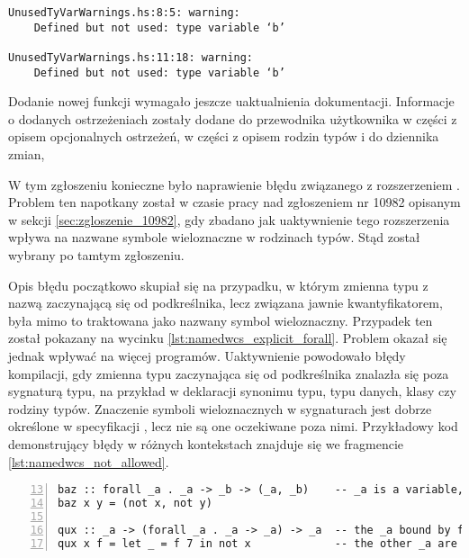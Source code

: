 \begin{lstlisting}[float,language={},label={lst:unused_test_stderr},
                   caption={Ostrzeżenia generowany przez kompilator dla fragmentu \ref{lst:unused_test_code} po wprowadzeniu zmian.}]
UnusedTyVarWarnings.hs:8:5: warning:
    Defined but not used: type variable ‘b’

UnusedTyVarWarnings.hs:11:18: warning:
    Defined but not used: type variable ‘b’
\end{lstlisting}

Dodanie nowej funkcji wymagało jeszcze uaktualnienia dokumentacji. Informacje o
dodanych ostrzeżeniach zostały dodane do przewodnika użytkownika w części z
opisem opcjonalnych ostrzeżeń, w części z opisem rodzin typów i do dziennika
zmian,


\label{sec:zgloszenie_11098}

W tym zgłoszeniu konieczne było naprawienie błędu związanego z rozszerzeniem
. Problem ten napotkany został w czasie pracy nad
zgłoszeniem nr 10982 opisanym w sekcji \ref{sec:zgloszenie_10982}, gdy zbadano
jak uaktywnienie tego rozszerzenia wpływa na nazwane symbole wieloznaczne w
rodzinach typów. Stąd został wybrany po tamtym zgłoszeniu.

Opis błędu początkowo skupiał się na przypadku, w którym zmienna typu z nazwą
zaczynającą się od podkreślnika, lecz związana jawnie kwantyfikatorem, była mimo
to traktowana jako nazwany symbol wieloznaczny. Przypadek ten został pokazany na
wycinku \ref{lst:namedwcs_explicit_forall}. Problem okazał się jednak wpływać na
więcej programów. Uaktywnienie  powodowało błędy
kompilacji, gdy zmienna typu zaczynająca się od podkreślnika znalazła się poza
sygnaturą typu, na przykład w deklaracji synonimu typu, typu danych, klasy czy
rodziny typów. Znaczenie symboli wieloznacznych w sygnaturach jest dobrze
określone w specyfikacji , lecz nie są one
oczekiwane poza nimi. Przykładowy kod demonstrujący błędy w różnych kontekstach
znajduje się we fragmencie \ref{lst:namedwcs_not_allowed}.

\begin{lstlisting}[float,numbers=left,firstnumber=13,label={lst:namedwcs_explicit_forall},
                   caption={Fragment testu \code{NamedWildcardExplicitForall} sprawdzającego, czy zmienne związane kwantyfikatorem nie zostają zamienione w wieloznaczniki.}]
baz :: forall _a . _a -> _b -> (_a, _b)    -- _a is a variable, _b is a wildcard
baz x y = (not x, not y)

qux :: _a -> (forall _a . _a -> _a) -> _a  -- the _a bound by forall is a tyvar
qux x f = let _ = f 7 in not x             -- the other _a are wildcards
\end{lstlisting}

